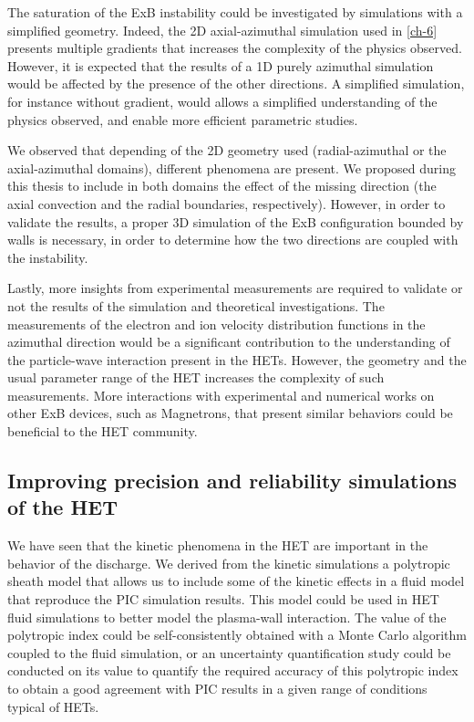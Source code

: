     The saturation of the ExB instability could be investigated by simulations with a simplified geometry.
    Indeed, the 2D axial-azimuthal simulation used in \cref{ch-6} presents multiple gradients that increases the complexity of the physics observed.
    However, it is expected that the results of a 1D purely azimuthal simulation would be affected by the presence of the other directions.
    A simplified simulation, for instance without gradient, would allows a simplified understanding of the physics observed, and enable more efficient parametric studies.

    We observed that depending of the 2D geometry used (radial-azimuthal or the axial-azimuthal domains), different phenomena are present.
    We proposed during this thesis to include in both domains the effect of the missing direction (the axial convection and the radial boundaries, respectively).
    However, in order to validate the results, a proper 3D simulation of the ExB configuration bounded by walls is necessary, in order to determine how the two directions are coupled with the instability.

    Lastly, more insights from experimental measurements are required to validate or not the results of the simulation and theoretical investigations.
    The measurements of the electron and ion velocity distribution functions in the azimuthal direction would be a significant contribution to the understanding of the particle-wave interaction present in the HETs.
    However, the geometry and the usual parameter range of the HET increases the complexity of such measurements.
    More interactions with experimental and numerical works on other ExB devices, such as Magnetrons, that present similar behaviors could be beneficial to the HET community.

  \subsection{Improving precision and reliability simulations of the HET}

    We have seen that the kinetic phenomena in the HET are important in the behavior of the discharge.
    We derived from the kinetic simulations a polytropic sheath model that allows us to include some of the kinetic effects in a fluid model that reproduce the PIC simulation results.
    This model could be used in HET fluid simulations to better model the plasma-wall interaction.
    The value of the polytropic index could be self-consistently obtained with a Monte Carlo algorithm coupled to the fluid simulation, or an uncertainty quantification study could be conducted on its value  to quantify the required accuracy of this polytropic index to obtain a good agreement with PIC results in a given range of conditions typical of HETs.


